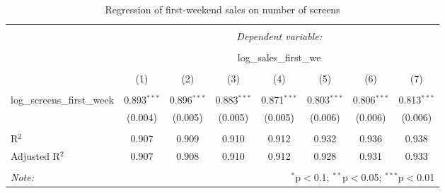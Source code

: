 \begin{table}[!htbp] \centering 
	\caption{Regression of first-weekend sales on number of screens} 
	\label{part2.1_tab1} 
	\begin{tabular}{@{\extracolsep{0pt}}lccccccc} 
		\\[-1.8ex]\hline 
		\hline \\[-1.8ex] 
		& \multicolumn{7}{c}{\textit{Dependent variable:}} \\ 
		\cline{2-8} 
		\\[-1.8ex] & \multicolumn{7}{c}{log\_sales\_first\_we} \\ 
		\\[-1.8ex] & (1) & (2) & (3) & (4) & (5) & (6) & (7)\\ 
		\hline \\[-1.8ex] 
		log\_screens\_first\_week & 0.893$^{***}$ & 0.896$^{***}$ & 0.883$^{***}$ & 0.871$^{***}$ & 0.803$^{***}$ & 0.806$^{***}$ & 0.813$^{***}$ \\ 
		& (0.004) & (0.005) & (0.005) & (0.005) & (0.006) & (0.006) & (0.006) \\ 
		\hline \\[-1.8ex] 
		R$^{2}$ & 0.907 & 0.909 & 0.910 & 0.912 & 0.932 & 0.936 & 0.938 \\ 
		Adjusted R$^{2}$ & 0.907 & 0.908 & 0.910 & 0.912 & 0.928 & 0.931 & 0.933 \\ 
		\hline 
		\hline \\[-1.8ex] 
		\textit{Note:}  & \multicolumn{7}{r}{$^{*}$p$<$0.1; $^{**}$p$<$0.05; $^{***}$p$<$0.01} \\ 
	\end{tabular} 
\end{table} 

